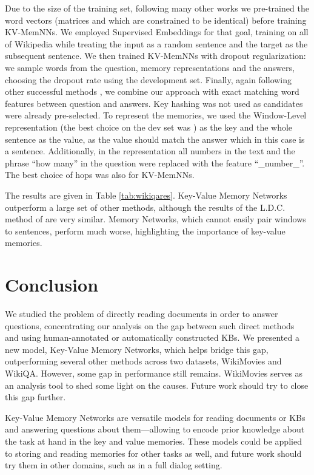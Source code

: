 \documentclass[11pt,letterpaper]{article}
\newcommand{\WikiMovies}{{\sc WikiMovies}\xspace}
\begin{document}
Due to the size of the training set, following many
other works \citep{yang2015wikiqa,santos2016attentive,miao2015neural}
we pre-trained the word vectors (matrices  and  which are constrained to be identical)
before training KV-MemNNs.
We employed Supervised Embeddings \citep{dodge2015evaluating}
for that goal, training on all of Wikipedia while
treating the input as a random sentence and the target as the subsequent sentence.
We then trained KV-MemNNs with dropout regularization:
we sample words from the question, memory representations and the answers,
choosing the dropout rate using the development set.
Finally, again following other successful methods \citep{yin2015convolutional},
we combine our approach
with exact matching word features between question and answers.
Key hashing was not used as candidates were already pre-selected.
To represent the memories, we used the Window-Level representation (the best choice on
the dev set was ) as the key and the whole sentence as the value, as the value should match the answer which in this case is a sentence.
Additionally, in the representation
all numbers in the text and the phrase ``how many'' in the question
were replaced with the feature ``\_number\_''.
The best choice of hops was also  for KV-MemNNs.

The results are given in Table \ref{tab:wikiqares}.
Key-Value Memory Networks outperform a large set of other methods,
although the results of the L.D.C. method of \citep{wang2016sentence} are very similar.
Memory Networks, which cannot easily pair windows to sentences, perform much worse,
highlighting the importance of key-value memories.
 
\section{Conclusion}
\vspace{-0.5ex}






We studied the problem of directly reading documents in order to answer questions,
concentrating our analysis on the gap between such direct methods and using
human-annotated or automatically constructed KBs.
We presented a new model, Key-Value Memory Networks, which helps bridge this gap,
outperforming several other methods across two datasets, \WikiMovies and {\sc WikiQA}.
However, some gap in performance still remains. \WikiMovies serves as an
 analysis tool to shed some light on the causes.
Future work should try to close this gap further.

Key-Value Memory Networks are versatile models for reading documents or KBs and answering
questions about them---allowing to encode prior knowledge about the task at hand
in the key and value memories. These models could be applied to storing and
reading memories
for other tasks as well, and future work should try them in other domains,
such as in a full dialog setting.
 



\end{document}
